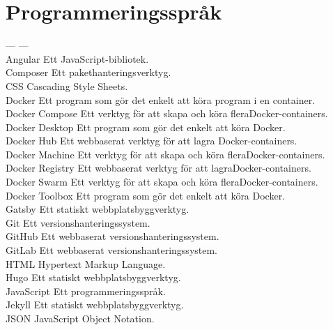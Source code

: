 \hypertarget{programmeringsspruxe5k}{%
\section{Programmeringsspråk}\label{programmeringsspruxe5k}}

--- \textbar{} --- \textbar{}\\
Angular \textbar{} Ett JavaScript-bibliotek. \textbar{}\\
Composer \textbar{} Ett pakethanteringsverktyg. \textbar{}\\
CSS \textbar{} Cascading Style Sheets. \textbar{}\\
Docker \textbar{} Ett program som gör det enkelt att köra program i en
container.\textbar{}\\
Docker Compose \textbar{} Ett verktyg för att skapa och köra
fleraDocker-containers. \textbar{}\\
Docker Desktop \textbar{} Ett program som gör det enkelt att köra
Docker. \textbar{}\\
Docker Hub \textbar{} Ett webbaserat verktyg för att lagra
Docker-containers.\textbar{}\\
Docker Machine \textbar{} Ett verktyg för att skapa och köra
fleraDocker-containers. \textbar{}\\
Docker Registry \textbar{} Ett webbaserat verktyg för att
lagraDocker-containers. \textbar{}\\
Docker Swarm \textbar{} Ett verktyg för att skapa och köra
fleraDocker-containers. \textbar{}\\
Docker Toolbox \textbar{} Ett program som gör det enkelt att köra
Docker. \textbar{}\\
Gatsby \textbar{} Ett statiskt webbplatsbyggverktyg. \textbar{}\\
Git \textbar{} Ett versionshanteringssystem. \textbar{}\\
GitHub \textbar{} Ett webbaserat versionshanteringssystem. \textbar{}\\
GitLab \textbar{} Ett webbaserat versionshanteringssystem. \textbar{}\\
HTML \textbar{} Hypertext Markup Language. \textbar{}\\
Hugo \textbar{} Ett statiskt webbplatsbyggverktyg. \textbar{}\\
JavaScript \textbar{} Ett programmeringsspråk. \textbar{}\\
Jekyll \textbar{} Ett statiskt webbplatsbyggverktyg. \textbar{}\\
JSON \textbar{} JavaScript Object Notation. \textbar{}\\
